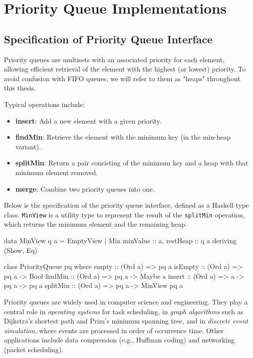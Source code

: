 \chapter{Priority Queue Implementations}
\label{ch:implementations}
\section{Specification of Priority Queue Interface}

Priority queues are multisets with an associated priority for each element, allowing efficient retrieval of the element with the highest (or lowest) priority.
To avoid confusion with FIFO queues, we will refer to them as "heaps" throughout this thesis.

Typical operations include:
\begin{itemize}
	\item \textbf{insert}: Add a new element with a given priority.
	\item \textbf{findMin}: Retrieve the element with the minimum key (in the min-heap variant).
	\item \textbf{splitMin}: Return a pair consisting of the minimum key and a heap with that minimum element removed.
	\item \textbf{merge}: Combine two priority queues into one.
\end{itemize}

Below is the specification of the priority queue interface, defined as a Haskell type class.
\texttt{MinView} is a utility type to represent the result of the \texttt{splitMin} operation,
which returns the minimum element and the remaining heap.

\begin{code}[caption={Leftist Heap Implementation in Haskell}, label={lst:pq}]

	data MinView q a =
	EmptyView | Min {minValue :: a, restHeap :: q a}
	deriving (Show, Eq)

	class PriorityQueue pq where
	empty :: (Ord a) => pq a
	isEmpty :: (Ord a) => pq a -> Bool
	findMin :: (Ord a) => pq a -> Maybe a
	insert :: (Ord a) => a -> pq a -> pq a
	splitMin :: (Ord a) => pq a -> MinView pq a
\end{code}

Priority queues are widely used in computer science and engineering.
They play a central role in \emph{operating systems} for task scheduling, in \emph{graph algorithms} such as Dijkstra’s shortest path and Prim’s minimum spanning tree, and in \emph{discrete event simulation}, where events are processed in order of occurrence time.
Other applications include data compression (e.g., Huffman coding) and networking (packet scheduling).

